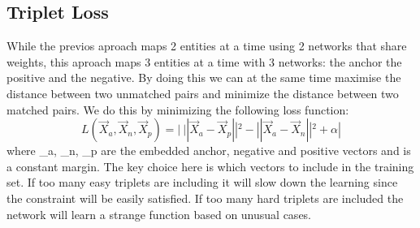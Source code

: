 \subsection{Triplet Loss}
While the previos aproach maps 2 entities at a time using 2 networks that share weights, this aproach maps 3 entities at a time with 3 networks: the anchor the positive and the negative. By doing this we can at the same time maximise the distance between two unmatched pairs and minimize the distance between two matched pairs.\cite{schroff2015facenet} We do this by minimizing the following loss function: \[ L(\vec{X}_a, \vec{X}_n, \vec{X}_p) = |\:||\vec{X}_a - \vec{X}_p||^2 - ||\vec{X}_a - \vec{X}_n||^2 + \alpha|\] where _a, _n, _p are the embedded anchor, negative and positive vectors and \alpha is a constant margin. The key choice here is which vectors to include in the training set. If too many easy triplets are including it will slow down the learning since the constraint will be easily satisfied. If too many hard triplets are included the network will learn a strange function based on unusual cases. 
